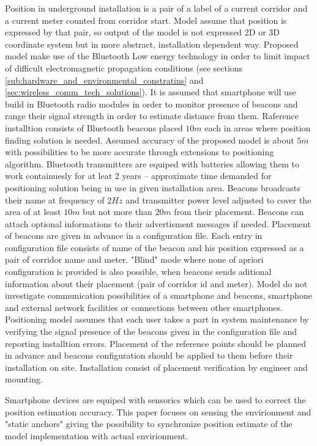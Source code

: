 \documentclass[../main.tex]{subfiles}
\begin{document}
Position in underground installation is a pair of a label of a current corridor and a current meter counted from corridor start. Model assume that position is expressed by that pair, so output of the model is not expressed 2D or 3D coordinate system but in more abstract, installation dependent way. Proposed model make use of the Bluetooth Low energy technology in order to limit impact of difficult electromagnetic propagation conditions (see sections \ref{sub:hardware_and_environmental_constratins} and \ref{sec:wireless_comm_tech_solutions}). It is assumed that smartphone will use build in Bluetooth radio modules in order to monitor presence of beacons and range their signal strength in order to estimate distance from them. Raference installtion consists of Bluetooth beacons placed $10m$ each in areas where position finding solution is needed. Assumed accuracy of the proposed model is about $5m$ with possibilities to be more accurate through extensions to positioning algorithm. Bluetooth transmitters are equiped with batteries allowing them to work containuesly for at leat 2 years -- approximate time demanded for positioning solution being in use in given installation area. Beacons broadcasts their name at frequency of $2Hz$ and transmitter power level adjusted to cover the area of at least $10m$ but not more than $20m$ from their placement. Beacons can attach optional informations to their advertisment messages if needed. Placement of beacons are given in advance in a configuration file. Each entry in configuration file consists of name of the beacon and his position expressed as a pair of corridor name and meter. "Blind" mode where none of apriori configuration is provided is also possible, when beacons sends aditional information about their placement (pair of corridor id and meter). Model do not investigate communication possibilities of a smartphone and beacons, smartphone and external network facilities or connections between other smartphones. Positioning model assumes that each user takes a part in system maintenance by verifying the signal presence of the beacons given in the configuration file and reporting installtion errors. Placement of the reference points should be planned in advance and beacons configuration should be applied to them before their installation on site. Installation consist of placement verification by engineer and mounting.

Smartphone devices are equiped with sensorics which can be used to correct the position estimation accuracy. This paper focuses on sensing the envirionment and "static anchors" giving the possibility to synchronize position estimate of the model implementation with actual envirionment.
\end{document}
